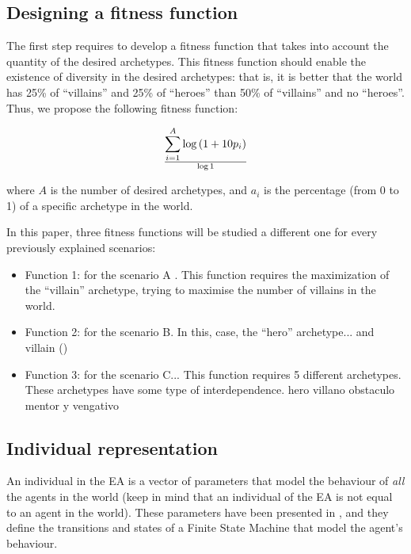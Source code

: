 \documentclass[runningheads,a4paper]{llncs}
\begin{document}
\subsection{Designing a fitness function}

The first step requires to develop a fitness function that takes into
account the quantity of the desired archetypes. This fitness function
should enable the existence of diversity in the desired
archetypes: that is, it is better that the world has 25\% of
``villains'' and 25\% of ``heroes'' than 50\% of ``villains'' and no
``heroes''. Thus, we propose the following fitness function: 

\begin{equation}
\sum _{i=1}^{A} {\log \left( 1+10p_{i}\right) } \over {\log 1}
\end{equation}

where $A$ is the number of desired archetypes, and $a_{i}$ is the
percentage (from 0 to 1) of a specific archetype in the world. %

In this paper, three fitness functions will be studied a different one
for every previously explained scenarios:
\begin{itemize}
\item Function 1: for the scenario A . This function requires the maximization of the ``villain'' archetype, trying to maximise the number of villains in the world. 
\item Function 2: for the scenario B. In this, case, the ``hero'' archetype... and villain ()
\item Function 3: for the scenario C... This function requires 5 different archetypes. These archetypes have some type of interdependence. hero villano obstaculo mentor y vengativo %
\end{itemize}

\subsection{Individual representation}


An individual in the EA is a vector of parameters that model the behaviour of {\em all} the agents in the world (keep in mind that an individual of the EA is not equal to an agent in the world). These parameters have been presented in \cite{garcia14my}, and they define the transitions and states of a Finite State Machine that model the agent's behaviour. 
\end{document}
